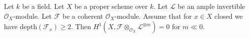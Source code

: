%
\begin{lemma}
\label{lemma-vanishin-h1-negative}
Let $k$ be a field. Let $X$ be a proper scheme over $k$. Let $\mathcal{L}$
be an ample invertible $\mathcal{O}_X$-module. Let $\mathcal{F}$ be a
coherent $\mathcal{O}_X$-module. Assume that
for $x \in X$ closed we have $\text{depth}(\mathcal{F}_x) \geq 2$.
Then
$H^1(X, \mathcal{F} \otimes_{\mathcal{O}_X} \mathcal{L}^{\otimes m}) = 0$
for $m \ll 0$.
\end{lemma}

